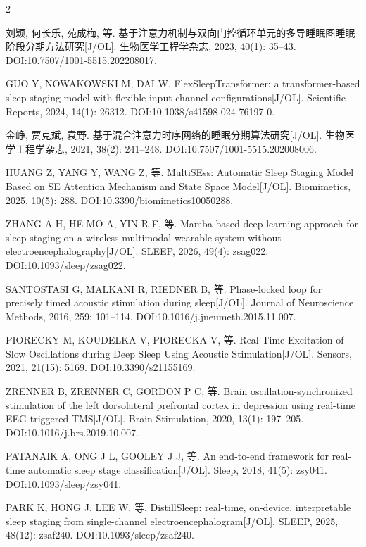 \documentclass[UTF8,zihao=5,fontset=none]{ctexart}
\begin{document}
\begin{multicols}{2}
{\makebox[25.2pt][l]{[46]}刘颖, 何长乐, 苑成梅, 等. 基于注意力机制与双向门控循环单元的多导睡眠图睡眠阶段分期方法研究[J/OL]. 生物医学工程学杂志, 2023, 40(1): 35--43. DOI:10.7507/1001-5515.202208017.\par
\makebox[25.2pt][l]{[47]}GUO Y, NOWAKOWSKI M, DAI W. FlexSleepTransformer: a transformer-based sleep staging model with flexible input channel configurations[J/OL]. Scientific Reports, 2024, 14(1): 26312. DOI:10.1038/s41598-024-76197-0.\par
\makebox[25.2pt][l]{[48]}金峥, 贾克斌, 袁野. 基于混合注意力时序网络的睡眠分期算法研究[J/OL]. 生物医学工程学杂志, 2021, 38(2): 241--248. DOI:10.7507/1001-5515.202008006.\par
\makebox[25.2pt][l]{[49]}HUANG Z, YANG Y, WANG Z, 等. MultiSEss: Automatic Sleep Staging Model Based on SE Attention Mechanism and State Space Model[J/OL]. Biomimetics, 2025, 10(5): 288. DOI:10.3390/biomimetics10050288.\par
\makebox[25.2pt][l]{[50]}ZHANG A H, HE-MO A, YIN R F, 等. Mamba-based deep learning approach for sleep staging on a wireless multimodal wearable system without electroencephalography[J/OL]. SLEEP, 2026, 49(4): zsag022. DOI:10.1093/sleep/zsag022.\par
\makebox[25.2pt][l]{[51]}SANTOSTASI G, MALKANI R, RIEDNER B, 等. Phase-locked loop for precisely timed acoustic stimulation during sleep[J/OL]. Journal of Neuroscience Methods, 2016, 259: 101--114. DOI:10.1016/j.jneumeth.2015.11.007.\par
\makebox[25.2pt][l]{[52]}PIORECKY M, KOUDELKA V, PIORECKA V, 等. Real-Time Excitation of Slow Oscillations during Deep Sleep Using Acoustic Stimulation[J/OL]. Sensors, 2021, 21(15): 5169. DOI:10.3390/s21155169.\par
\makebox[25.2pt][l]{[53]}ZRENNER B, ZRENNER C, GORDON P C, 等. Brain oscillation-synchronized stimulation of the left dorsolateral prefrontal cortex in depression using real-time EEG-triggered TMS[J/OL]. Brain Stimulation, 2020, 13(1): 197--205. DOI:10.1016/j.brs.2019.10.007.\par
\makebox[25.2pt][l]{[54]}PATANAIK A, ONG J L, GOOLEY J J, 等. An end-to-end framework for real-time automatic sleep stage classification[J/OL]. Sleep, 2018, 41(5): zsy041. DOI:10.1093/sleep/zsy041.\par
\makebox[25.2pt][l]{[55]}PARK K, HONG J, LEE W, 等. DistillSleep: real-time, on-device, interpretable sleep staging from single-channel electroencephalogram[J/OL]. SLEEP, 2025, 48(12): zsaf240. DOI:10.1093/sleep/zsaf240.\par
}
\end{multicols}
\end{document}
